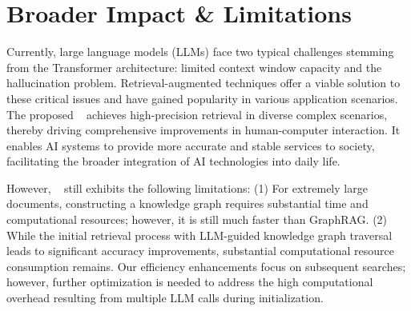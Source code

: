 \section{Broader Impact \& Limitations}
\label{appendix:limitations}

Currently, large language models (LLMs) face two typical challenges stemming from the Transformer architecture: limited context window capacity and the hallucination problem. Retrieval-augmented techniques offer a viable solution to these critical issues and have gained popularity in various application scenarios. The proposed \ours~ achieves high-precision retrieval in diverse complex scenarios, thereby driving comprehensive improvements in human-computer interaction. It enables AI systems to provide more accurate and stable services to society, facilitating the broader integration of AI technologies into daily life.

However, \ours~ still exhibits the following limitations: (1) For extremely large documents, constructing a knowledge graph requires substantial time and computational resources; however, it is still much faster than GraphRAG. (2) While the initial retrieval process with LLM-guided knowledge graph traversal leads to significant accuracy improvements, substantial computational resource consumption remains. Our efficiency enhancements focus on subsequent searches; however, further optimization is needed to address the high computational overhead resulting from multiple LLM calls during initialization.